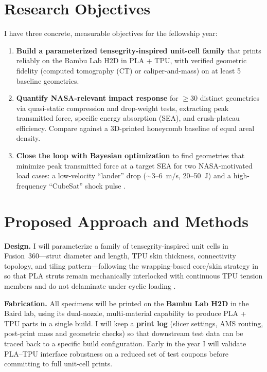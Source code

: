 \documentclass[11pt]{article}
\begin{document}
\section{Research Objectives}

I have three concrete, measurable objectives for the fellowship year:

\begin{enumerate}[leftmargin=1.5em,itemsep=0.2em]
    \item \textbf{Build a parameterized tensegrity-inspired unit-cell family}
    that prints reliably on the Bambu Lab H2D in PLA + TPU, with verified
    geometric fidelity (computed tomography (CT) or caliper-and-mass) on at least 5 baseline
    geometries.
    \item \textbf{Quantify NASA-relevant impact response} for $\geq 30$
    distinct geometries via quasi-static compression and drop-weight tests,
    extracting peak transmitted force, specific energy absorption (SEA),
    and crush-plateau efficiency.  Compare against a 3D-printed honeycomb
    baseline of equal areal density.
    \item \textbf{Close the loop with Bayesian optimization} to find geometries
    that minimize peak transmitted force at a target SEA for two
    NASA-motivated load cases: a low-velocity ``lander'' drop ($\sim$3--6~m/s,
    20--50~J) and a high-frequency ``CubeSat'' shock pulse
    \citep{nasagsfc2018gevs}.
\end{enumerate}

\section{Proposed Approach and Methods}

\textbf{Design.} I will parameterize a family of tensegrity-inspired unit
cells in Fusion~360---strut diameter and length, TPU skin thickness,
connectivity topology, and tiling pattern---following the wrapping-based
core/skin strategy in \citep{ye2023multimaterial} so that PLA struts
remain mechanically interlocked with continuous TPU tension members and do
not delaminate under cyclic loading \citep{khatri2024energy}.

\textbf{Fabrication.} All specimens will be printed on the
\textbf{Bambu Lab H2D} in the Baird lab, using its dual-nozzle, multi-material
capability to produce PLA + TPU parts in a single build.  I will keep a
\textbf{print log} (slicer settings, AMS routing, post-print mass and
geometric checks) so that downstream test data can be traced back to a
specific build configuration.  Early in the year I will validate
PLA--TPU interface robustness on a reduced set of test coupons before
committing to full unit-cell prints.
\end{document}
